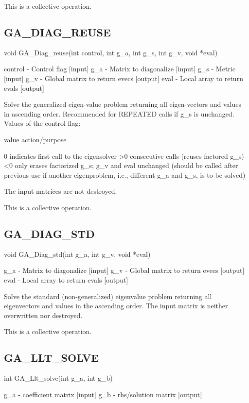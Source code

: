 This is a collective operation. 


\subsection*{GA\_DIAG\_REUSE}

void GA\_Diag\_reuse(int control, int g\_a, int g\_s, int g\_v, void
{*}eval)

control - Control flag {[}input{]} g\_a - Matrix to diagonalize {[}input{]}
g\_s - Metric {[}input{]} g\_v - Global matrix to return evecs {[}output{]}
eval - Local array to return evals {[}output{]}

Solve the generalized eigen-value problem returning all eigen-vectors
and values in ascending order. Recommended for REPEATED calls if g\_s
is unchanged. Values of the control flag:

value action/purpose

0 indicates first call to the eigensolver >0 consecutive calls (reuses
factored g\_s) <0 only erases factorized g\_s; g\_v and eval unchanged
(should be called after previous use if another eigenproblem, i.e.,
different g\_a and g\_s, is to be solved)

The input matrices are not destroyed.

This is a collective operation. 


\subsection*{GA\_DIAG\_STD}

void GA\_Diag\_std(int g\_a, int g\_v, void {*}eval)

g\_a - Matrix to diagonalize {[}input{]} g\_v - Global matrix to return
evecs {[}output{]} eval - Local array to return evals {[}output{]}

Solve the standard (non-generalized) eigenvalue problem returning
all eigenvectors and values in the ascending order. The input matrix
is neither overwritten nor destroyed.

This is a collective operation. 


\subsection*{GA\_LLT\_SOLVE}

int GA\_Llt\_solve(int g\_a, int g\_b)

g\_a - coefficient matrix {[}input{]} g\_b - rhs/solution matrix {[}output{]}

